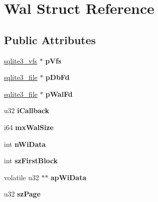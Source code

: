\hypertarget{struct_wal}{\section{Wal Struct Reference}
\label{struct_wal}
}
\subsection*{Public Attributes}
\begin{DoxyCompactItemize}
\item 
\hypertarget{struct_wal_a5431b060acbc998a7e3710587abaa11e}{\hyperlink{structsqlite3__vfs}{sqlite3\-\_\-vfs} $\ast$ {\bfseries p\-Vfs}}\label{struct_wal_a5431b060acbc998a7e3710587abaa11e}

\item 
\hypertarget{struct_wal_a3a4d051c55228e554b36691c5095ed14}{\hyperlink{structsqlite3__file}{sqlite3\-\_\-file} $\ast$ {\bfseries p\-Db\-Fd}}\label{struct_wal_a3a4d051c55228e554b36691c5095ed14}

\item 
\hypertarget{struct_wal_aea2a72ead42cfe57e3a6809e80884397}{\hyperlink{structsqlite3__file}{sqlite3\-\_\-file} $\ast$ {\bfseries p\-Wal\-Fd}}\label{struct_wal_aea2a72ead42cfe57e3a6809e80884397}

\item 
\hypertarget{struct_wal_aae230a2317817739a5f08ebb28b644b0}{u32 {\bfseries i\-Callback}}\label{struct_wal_aae230a2317817739a5f08ebb28b644b0}

\item 
\hypertarget{struct_wal_a413f9f82c15d31627a2ed6eac9b6cc27}{i64 {\bfseries mx\-Wal\-Size}}\label{struct_wal_a413f9f82c15d31627a2ed6eac9b6cc27}

\item 
\hypertarget{struct_wal_ae3e69420adab92acd90dd7c03d37815f}{int {\bfseries n\-Wi\-Data}}\label{struct_wal_ae3e69420adab92acd90dd7c03d37815f}

\item 
\hypertarget{struct_wal_a901c02626270f4d51db89786e4994da9}{int {\bfseries sz\-First\-Block}}\label{struct_wal_a901c02626270f4d51db89786e4994da9}

\item 
\hypertarget{struct_wal_a2b0078e3adfd1fb21794561bb12bbfac}{volatile u32 $\ast$$\ast$ {\bfseries ap\-Wi\-Data}}\label{struct_wal_a2b0078e3adfd1fb21794561bb12bbfac}

\item 
\hypertarget{struct_wal_a771c3a8c81326babc7d623255a6034c5}{u32 {\bfseries sz\-Page}}\label{struct_wal_a771c3a8c81326babc7d623255a6034c5}


\end{DoxyCompactItemize}
